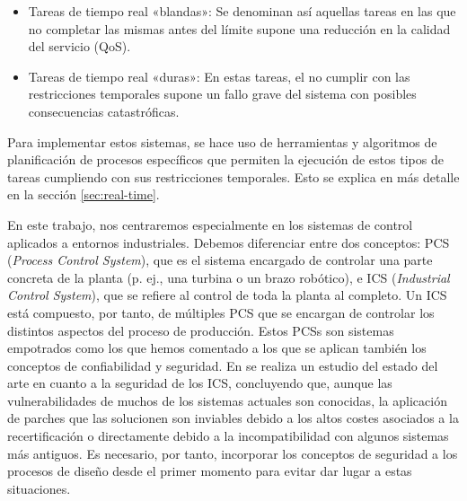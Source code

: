 \begin{itemize}
  \item Tareas de tiempo real «blandas»: Se denominan así aquellas tareas en las
        que no completar las mismas antes del límite supone una reducción en la
        calidad del servicio (QoS).
  \item Tareas de tiempo real «duras»: En estas tareas, el no cumplir con las
        restricciones temporales supone un fallo grave del sistema con posibles
        consecuencias catastróficas.
\end{itemize}

Para implementar estos sistemas, se hace uso de herramientas y algoritmos de
planificación de procesos específicos que permiten la ejecución de estos tipos
de tareas cumpliendo con sus restricciones temporales. Esto se explica en más
detalle en la sección \ref{sec:real-time}.

En este trabajo, nos centraremos especialmente en los sistemas de control
aplicados a entornos industriales. Debemos diferenciar entre dos conceptos: PCS
(\textit{Process Control System}), que es el sistema encargado de controlar una
parte concreta de la planta (p. ej., una turbina o un brazo robótico), e ICS
(\textit{Industrial Control System}), que se refiere al control de toda la
planta al completo. Un ICS está compuesto, por tanto, de múltiples PCS que se
encargan de controlar los distintos aspectos del proceso de producción. Estos
PCSs son sistemas empotrados como los que hemos comentado a los que se aplican
también los conceptos de confiabilidad y seguridad. En
\cite{krotofil_industrial_2013} se realiza un estudio del estado del arte en
cuanto a la seguridad de los ICS, concluyendo que, aunque las vulnerabilidades
de muchos de los sistemas actuales son conocidas, la aplicación de parches que
las solucionen son inviables debido a los altos costes asociados a la
recertificación o directamente debido a la incompatibilidad con algunos sistemas
más antiguos. Es necesario, por tanto, incorporar los conceptos de seguridad a
los procesos de diseño desde el primer momento para evitar dar lugar a estas
situaciones.

